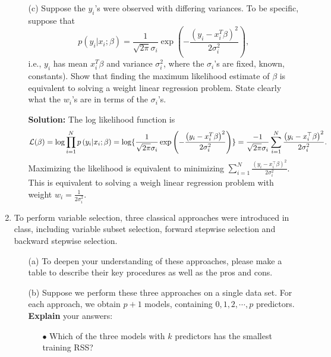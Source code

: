 \documentclass[10pt]{article}
\begin{document}
\begin{enumerate}[1.]
\begin{itemize}
        	
        	
        	\item[(c)] Suppose the $y_{i}$'s were observed with differing variances. To be specific, suppose that
        	\begin{equation}
        		p(y_{i}|x_{i};\beta) = \frac{1}{\sqrt{2\pi}\sigma_{i}}\exp\left( -\frac{(y_{i}-x_{i}^{T}\beta)^{2}}{2\sigma_{i}^{2}}\right),
        	\end{equation}
		i.e., $y_{i}$ has mean $x_{i}^{T}\beta$ and variance $\sigma_{i}^{2}$, 
		where the $\sigma_{i}$'s are fixed, known, constants). Show that finding the maximum likelihood 
		estimate of $\beta$ is equivalent to solving a weight linear regression problem. State clearly what the $w_{i}$'s are in terms of the $\sigma_{i}$'s.~   
		 
		\textbf{Solution:}  The log likelihood function is 
		$$\mathcal{L}(\beta)=\log \prod_{i=1}^{N} p\left(y_{i} | x_{i} ; \beta\right)=\log\{\frac{1}{\sqrt{2 \pi} \sigma_{i}} \exp 
		\left(-\frac{\left(y_{i}-x_{i}^{T} \beta \right)^{2}}{2 \sigma_{i}^{2}}\right)\}\\
		=\frac{-1}{\sqrt{2 \pi} \sigma_{i}} \sum_{i=1}^{N} \frac{\left(y_{i}-x_{i}^{\top} \beta\right)^{2}}{2 \sigma_{i}^{2}}.$$
		Maximizing the likelihood is equivalent to minimizing 
		$\sum\limits_{i=1}^{N} \frac{\left(y_{i}-x_{i}^{\top} \beta\right)^{2}}{2 \sigma_{i}^{2}}$. 
		This is equivalent to solving a weigh linear regression problem with weight $w_i=\frac{1}{2\sigma_i^2}$.
		
		
			
		\end{itemize}
		




    	
    	\item To perform variable selection, three classical approaches were introduced in class, including variable subset selection, forward stepwise selection and backward stepwise selection. 
    	\begin{itemize}
    		\item[(a)] To deepen your understanding of these approaches, please make a table to describe their key procedures as well as the pros and cons.~
    		
    		\item[(b)] Suppose we perform these three approaches on a single data set. For each approach, we obtain $p + 1$
models, containing $0, 1, 2, \cdots, p$ predictors. \textbf{Explain} your answers:
    		\begin{itemize}
    			\item[$\bullet$] Which of the three models with $k$ predictors has the smallest
training \textrm{RSS}? 
    			

\end{itemize}
\end{itemize}
\end{enumerate}
\end{document}

